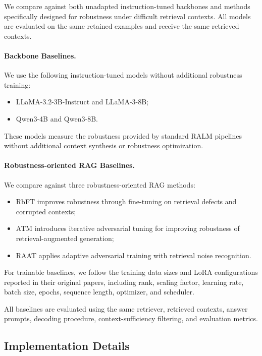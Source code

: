 \documentclass[11pt]{article}
\begin{document}
We compare against both unadapted instruction-tuned backbones and methods specifically designed for robustness under difficult retrieval contexts. 
All models are evaluated on the same retained examples and receive the same retrieved contexts.

\paragraph{Backbone Baselines.}

We use the following instruction-tuned models without additional robustness training:

\begin{itemize}
    \item LLaMA-3.2-3B-Instruct and LLaMA-3-8B;
    \item Qwen3-4B and Qwen3-8B.
\end{itemize}

These models measure the robustness provided by standard RALM pipelines without additional context synthesis or robustness optimization.

\paragraph{Robustness-oriented RAG Baselines.}

We compare against three robustness-oriented RAG methods:

\begin{itemize}
    \item RbFT improves robustness through fine-tuning on retrieval defects and corrupted contexts;
    \item ATM introduces iterative adversarial tuning for improving robustness of retrieval-augmented generation;
    \item RAAT applies adaptive adversarial training with retrieval noise recognition.
\end{itemize}

For trainable baselines, we follow the training data sizes and LoRA configurations reported in their original papers, including rank, scaling factor, learning rate, batch size, epochs, sequence length, optimizer, and scheduler.

All baselines are evaluated using the same retriever, retrieved contexts, answer prompts, decoding procedure, context-sufficiency filtering, and evaluation metrics.

\subsection{Implementation Details}
\end{document}
